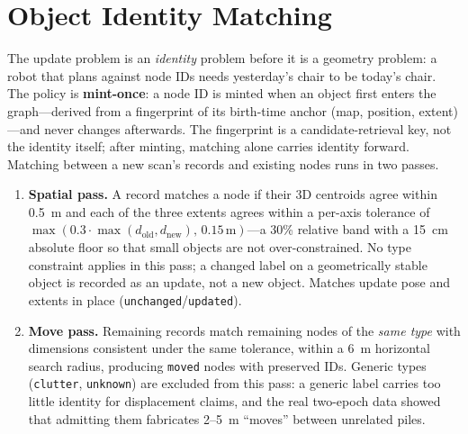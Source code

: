 \section{Object Identity Matching}
\label{sec:matching}

The update problem is an \emph{identity} problem before it is a geometry
problem: a robot that plans against node IDs needs yesterday's chair to be
today's chair. The policy is \textbf{mint-once}: a node ID is minted when an
object first enters the graph---derived from a fingerprint of its birth-time
anchor (map, position, extent)---and never changes afterwards. The fingerprint
is a candidate-retrieval key, not the identity itself; after minting, matching
alone carries identity forward. Matching between a new scan's records and
existing nodes runs in two passes.

\begin{enumerate}
\item \textbf{Spatial pass.} A record matches a node if their 3D centroids
agree within 0.5~m and each of the three extents agrees within a per-axis
tolerance of $\max(0.3\cdot\max(d_{\mathrm{old}},d_{\mathrm{new}}),\,0.15\,\mathrm{m})$---a
30\% relative band with a 15~cm absolute floor so that small objects are not
over-constrained. No type constraint applies in this pass; a changed label on a
geometrically stable object is recorded as an update, not a new object. Matches
update pose and extents in place (\texttt{unchanged}/\texttt{updated}).
\item \textbf{Move pass.} Remaining records match remaining nodes of the
\emph{same type} with dimensions consistent under the same tolerance, within a
6~m horizontal search radius, producing \texttt{moved} nodes with preserved
IDs. Generic types (\texttt{clutter}, \texttt{unknown}) are excluded from this
pass: a generic label carries too little identity for displacement claims, and
the real two-epoch data showed that admitting them fabricates 2--5~m ``moves''
between unrelated piles.
\end{enumerate}

